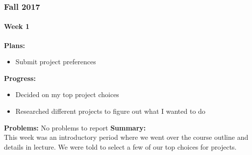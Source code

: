\subsubsection{Fall 2017}
\paragraph{Week 1}
\begin{adjustwidth}{2.5em}{0pt}
    \vspace{-0.5cm}\textbf{Plans:}
    \vspace{-0.5cm}
    \begin{itemize}
        \item Submit project preferences
    \end{itemize} 
    \vspace{-0.3cm}\textbf{Progress:}
    \vspace{-0.5cm}
    \begin{itemize}
        \item Decided on my top project choices
        \item Researched different projects to figure out what I wanted to do
    \end{itemize} 
    \vspace{-0.3cm}\textbf{Problems:}
    \vspace{-0.5cm}
    \noindent No problems to report   
    \vspace{-0.3cm}\noindent\textbf{Summary:}\\
    \noindent This week was an introductory period where we went over the course outline and details in lecture. We were told to select a few of our top choices for projects.
\end{adjustwidth}
